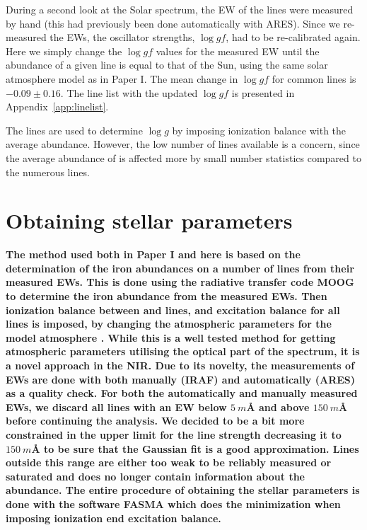\documentclass{aa}
\begin{document}
During a second look at the Solar spectrum, the EW of the lines were measured by
hand (this had previously been done automatically with ARES). Since we
re-measured the EWs, the oscillator strengths, $\log \mathit{gf}$, had to be
re-calibrated again. Here we simply change the $\log \mathit{gf}$ values for the
measured EW until the abundance of a given line is equal to that of the Sun,
using the same solar atmosphere model as in Paper I. The mean change in $\log
\mathit{gf}$ for common lines is $-0.09 \pm 0.16$. The line list with the
updated $\log \mathit{gf}$ is presented in Appendix~\ref{app:linelist}.

The  lines are used to determine $\log g$ by imposing ionization
balance with the average  abundance. However, the low number of
 lines available is a concern, since the average abundance of
 is affected more by small number statistics compared to the
numerous  lines.


\section{Obtaining stellar parameters}
\label{sec:method}

{\bf The method used both in Paper I and here is based on the determination of
the iron abundances on a number of lines from their measured EWs. This is done
using the radiative transfer code MOOG \citep{Sneden1973} to determine the iron
abundance from the measured EWs. Then ionization balance between  and
 lines, and excitation balance for all  lines is imposed,
by changing the atmospheric parameters for the model atmosphere \citep[][ATLAS9
is used here]{Kurucz1993}. While this is a well tested method for getting
atmospheric parameters utilising the optical part of the spectrum, it is a novel
approach in the NIR. Due to its novelty, the measurements of EWs are done with
both manually (IRAF) and automatically (ARES) as a quality check. For both the
automatically and manually measured EWs, we discard all lines with an EW below
$\SI{5}{m}$\AA{} and above $\SI{150}{m}$\AA{} before continuing the analysis. We
decided to be a bit more constrained in the upper limit for the line strength
decreasing it to $\SI{150}{m}$\AA{} to be sure that the Gaussian fit is a good
approximation. Lines outside this range are either too weak to be reliably
measured or saturated and does no longer contain information about the
abundance. The entire procedure of obtaining the stellar parameters is done with
the software FASMA \citep{Andreasen2017a} which does the minimization when
imposing ionization end excitation balance.}
\end{document}
